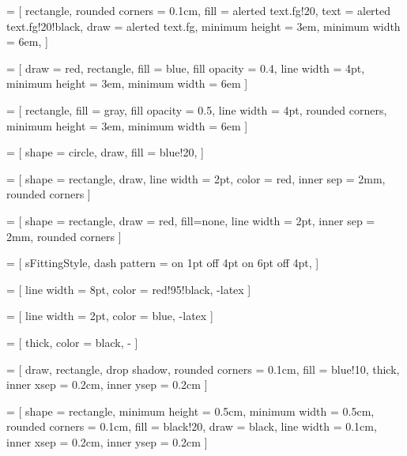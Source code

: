  =
[
rectangle,
rounded corners = 0.1cm,
fill            = alerted text.fg!20,       %
text            = alerted text.fg!20!black, %
draw            = alerted text.fg,          %
minimum height  = 3em,
minimum width   = 6em,
]

 =
[
draw = red,
rectangle,
fill            = blue,
fill opacity = 0.4,
line width = 4pt,
minimum height  = 3em,
minimum width   = 6em
]


 =
[
rectangle,
fill            = gray,
fill opacity = 0.5,
line width = 4pt,
rounded corners,
minimum height  = 3em,
minimum width   = 6em
]


 =
[
shape           = circle,
draw,
fill            = blue!20,
]

 =
[
shape = rectangle,
draw,
line width = 2pt,
color = red,
inner sep = 2mm,
rounded corners
]

 =
[
shape = rectangle,
draw = red,
fill=none,
line width = 2pt,
inner sep = 2mm,
rounded corners
]

 =
[
sFittingStyle,
dash pattern = on 1pt off 4pt on 6pt off 4pt,
]


 =
[
line width = 8pt,
color   = red!95!black,
-latex
]


 =
[
line width = 2pt,
color   = blue,
-latex
]


 =
[
thick,
color   = black,
-
]




 =
[
draw,
rectangle,
drop shadow,
rounded corners = 0.1cm,
fill            = blue!10,
thick,
inner xsep      = 0.2cm,        %
inner ysep      = 0.2cm         %
]



\tikzfading %
[
name            = middle,
top color       = transparent!100,
bottom color    = transparent!100,
middle color    = transparent!00,
]



 =
[
shape           = rectangle,
minimum height  = 0.5cm,
minimum width   = 0.5cm,
rounded corners = 0.1cm,
fill            = black!20,
draw            = black,
line width      = 0.1cm,
inner xsep      = 0.2cm,
inner ysep      = 0.2cm
]


